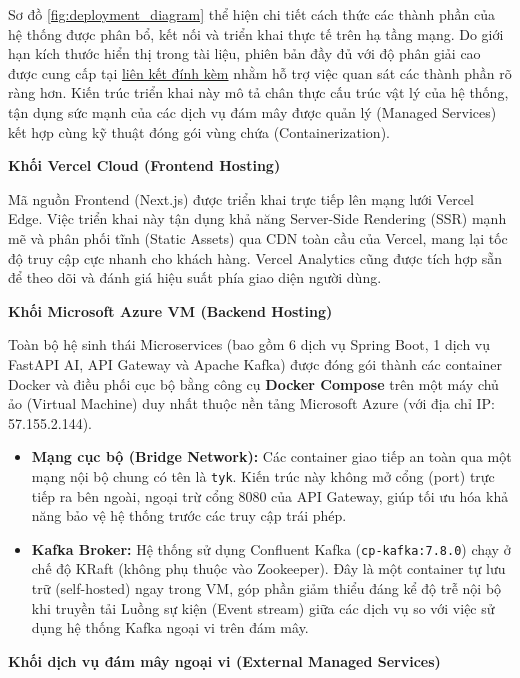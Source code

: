 Sơ đồ \ref{fig:deployment_diagram} thể hiện chi tiết cách thức các thành phần của hệ thống được phân bổ, kết nối và triển khai thực tế trên hạ tầng mạng. Do giới hạn kích thước hiển thị trong tài liệu, phiên bản đầy đủ với độ phân giải cao được cung cấp tại \href{https://drive.google.com/file/d/1qfIlCt7C07wGTaG6CrbSDzNkafoRDNpT/view?usp=drive_link}{liên kết đính kèm} nhằm hỗ trợ việc quan sát các thành phần rõ ràng hơn. Kiến trúc triển khai này mô tả chân thực cấu trúc vật lý của hệ thống, tận dụng sức mạnh của các dịch vụ đám mây được quản lý (Managed Services) kết hợp cùng kỹ thuật đóng gói vùng chứa (Containerization).

\textbf{Khối Vercel Cloud (Frontend Hosting)}

Mã nguồn Frontend (Next.js) được triển khai trực tiếp lên mạng lưới Vercel Edge. Việc triển khai này tận dụng khả năng Server-Side Rendering (SSR) mạnh mẽ và phân phối tĩnh (Static Assets) qua CDN toàn cầu của Vercel, mang lại tốc độ truy cập cực nhanh cho khách hàng. Vercel Analytics cũng được tích hợp sẵn để theo dõi và đánh giá hiệu suất phía giao diện người dùng.
\bigskip

\textbf{Khối Microsoft Azure VM (Backend Hosting)}

Toàn bộ hệ sinh thái Microservices (bao gồm 6 dịch vụ Spring Boot, 1 dịch vụ FastAPI AI, API Gateway và Apache Kafka) được đóng gói thành các container Docker và điều phối cục bộ bằng công cụ \textbf{Docker Compose} trên một máy chủ ảo (Virtual Machine) duy nhất thuộc nền tảng Microsoft Azure (với địa chỉ IP: 57.155.2.144).
\begin{itemize}
    \item \textbf{Mạng cục bộ (Bridge Network):} Các container giao tiếp an toàn qua một mạng nội bộ chung có tên là \texttt{tyk}. Kiến trúc này không mở cổng (port) trực tiếp ra bên ngoài, ngoại trừ cổng 8080 của API Gateway, giúp tối ưu hóa khả năng bảo vệ hệ thống trước các truy cập trái phép.
    \item \textbf{Kafka Broker:} Hệ thống sử dụng Confluent Kafka (\texttt{cp-kafka:7.8.0}) chạy ở chế độ KRaft (không phụ thuộc vào Zookeeper). Đây là một container tự lưu trữ (self-hosted) ngay trong VM, góp phần giảm thiểu đáng kể độ trễ nội bộ khi truyền tải Luồng sự kiện (Event stream) giữa các dịch vụ so với việc sử dụng hệ thống Kafka ngoại vi trên đám mây.
\end{itemize}
\bigskip

\textbf{Khối dịch vụ đám mây ngoại vi (External Managed Services)}


